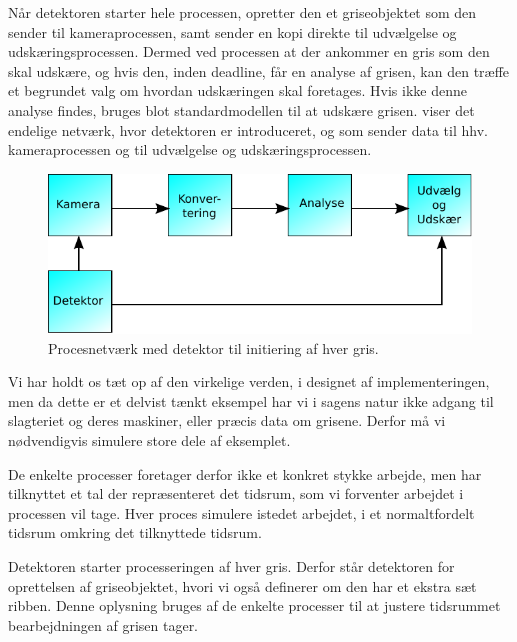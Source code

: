 Når detektoren starter hele processen, opretter den et griseobjektet som den sender til kameraprocessen, samt sender en kopi direkte til udvælgelse og udskæringsprocessen. Dermed ved processen at der ankommer en gris som den skal udskære, og hvis den, inden deadline, får en analyse af grisen, kan den træffe et begrundet valg om hvordan udskæringen skal foretages. Hvis ikke denne analyse findes, bruges blot standardmodellen til at udskære grisen.  viser det endelige  netværk, hvor detektoren er introduceret, og som sender data til hhv. kameraprocessen og til udvælgelse og udskæringsprocessen. 

\begin{figure}
 \begin{center}
  \includegraphics[scale=1]{images/pig-network2}
	\caption{Procesnetværk med detektor til initiering af hver gris.}
	\label{fig:pig-network2}
\end{center}
\end{figure}

Vi har holdt os tæt op af den virkelige verden, i designet af implementeringen, men da dette er et delvist tænkt eksempel har vi i  sagens natur ikke  adgang til slagteriet og deres maskiner, eller præcis data om grisene. Derfor må vi nødvendigvis simulere store dele af eksemplet. 

De enkelte processer foretager derfor ikke et konkret stykke arbejde, men har  tilknyttet et tal der repræsenteret det tidsrum, som vi forventer arbejdet i processen vil tage. Hver proces simulere istedet arbejdet, i et  normaltfordelt tidsrum omkring det tilknyttede tidsrum.

Detektoren starter processeringen af hver gris. Derfor står detektoren for oprettelsen af griseobjektet, hvori vi også  definerer om den har et ekstra sæt ribben. Denne oplysning bruges af de enkelte processer til at justere tidsrummet bearbejdningen af grisen tager. 

